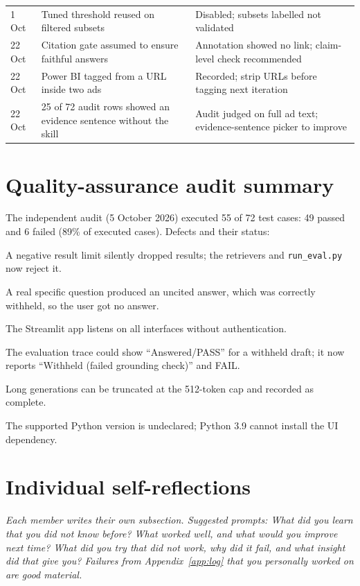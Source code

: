 \begin{table}[H]
\begin{tabularx}{\linewidth}{lYY}
1 Oct & Tuned threshold reused on filtered subsets & Disabled; subsets labelled not validated \\
22 Oct & Citation gate assumed to ensure faithful answers & Annotation showed no link; claim-level check recommended \\
22 Oct & Power BI tagged from a URL inside two ads & Recorded; strip URLs before tagging next iteration \\
22 Oct & 25 of 72 audit rows showed an evidence sentence without the skill & Audit judged on full ad text; evidence-sentence picker to improve \\
\bottomrule
\end{tabularx}
\end{table}

\section{Quality-assurance audit summary}\label{app:qa}
The independent audit (5 October 2026) executed 55 of 72 test cases: 49 passed and 6 failed (89\% of executed cases). Defects and their status:
\begin{description}[leftmargin=0pt,font=\normalfont\bfseries]
  \item[QA-01 (low, fixed 23 Oct)] A negative result limit silently dropped results; the retrievers and \texttt{run\_eval.py} now reject it.
  \item[QA-02 (moderate)] A real specific question produced an uncited answer, which was correctly withheld, so the user got no answer.
  \item[QA-03 (moderate)] The Streamlit app listens on all interfaces without authentication.
  \item[QA-04 (low--moderate, fixed 23 Oct)] The evaluation trace could show ``Answered/PASS'' for a withheld draft; it now reports ``Withheld (failed grounding check)'' and FAIL.
  \item[QA-05 (moderate)] Long generations can be truncated at the 512-token cap and recorded as complete.
  \item[QA-06 (low)] The supported Python version is undeclared; Python 3.9 cannot install the UI dependency.
\end{description}

\section{Individual self-reflections}\label{app:reflect}
\noindent\emph{Each member writes their own subsection. Suggested prompts: What did you learn that you did not know before? What worked well, and what would you improve next time? What did you try that did not work, why did it fail, and what insight did that give you? Failures from Appendix~\ref{app:log} that you personally worked on are good material.}


